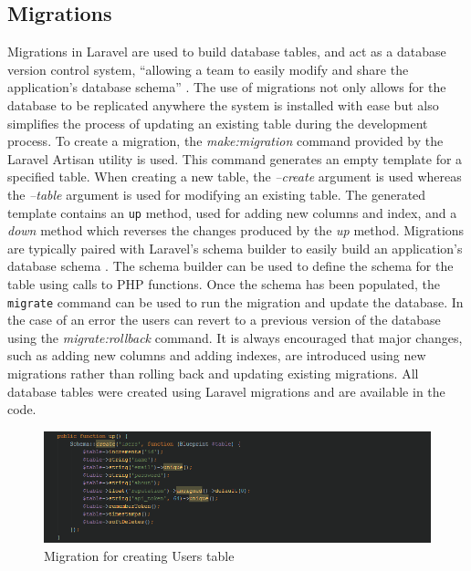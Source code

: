 \subsection{Migrations}
Migrations in Laravel are used to build database tables, and act as a database version control system, ``allowing a team to easily modify and share the application's database schema'' \cite{Laravel:Migrations}. The use of migrations not only allows for the database to be replicated anywhere the system is installed with ease but also simplifies the process of updating an existing table during the development process.  To create a migration, the \emph{make:migration} command provided by the Laravel Artisan utility is used. This command generates an empty template for a specified table. When creating a new table, the \emph{--create} argument is used whereas the \emph{--table} argument is used for modifying an existing table. The generated template contains an \texttt{up} method, used for adding new columns and index, and a \emph{down} method which reverses the changes produced by the \emph{up} method. Migrations are typically paired with Laravel's schema builder to easily build an application's database schema \cite{Laravel:Migrations}. The schema builder can be used to define the schema for the table using calls to PHP functions. Once the schema has been populated, the \texttt{migrate} command can be used to run the migration and update the database. In the case of an error the users can revert to a previous version of the database using the \emph{migrate:rollback} command. It is always encouraged that major changes, such as adding new columns and adding indexes, are introduced using new migrations rather than rolling back and updating existing migrations. All database tables were created using Laravel migrations and are available in the code.

\begin{figure}[H]
	\centering
	\includegraphics[width=\textwidth]{Images/Implementation/UserMigration}
	\caption{Migration for creating Users table} \label{fig:UserMigration}
\end{figure}

